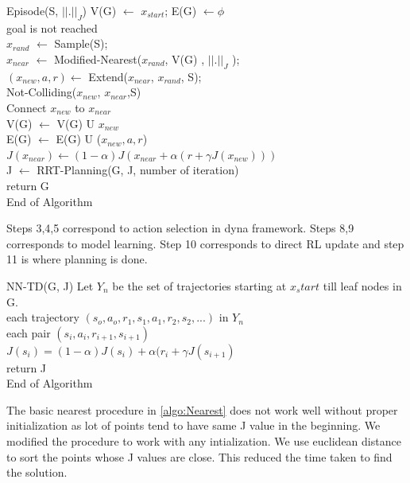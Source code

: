\documentclass[MTech]{iitmdiss}
\begin{document}
\begin{algorithm}{Episode(S, $|| . ||_J$)}{
\label{algo:Dyna-Episode}
}
 V(G) $\leftarrow$ {$x_{start}$};  E(G) $\leftarrow${$\phi$ } \\
\qwhile goal is not reached \\
$x_{rand}$ $\leftarrow$ Sample(S);\\
$x_{near}$ $\leftarrow$ Modified-Nearest($x_{rand}$, V(G) , $|| . ||_J $ );\\
$(x_{new}, a, r) \leftarrow$ Extend($x_{near}$, $x_{rand}$, S);\\
\qif Not-Colliding($x_{new}$, $x_{near}$,S)\\
\qthen Connect $x_{new}$ to $x_{near}$\\
V(G) $\leftarrow$ V(G) U {$ x_{new}$ }\\
E(G) $\leftarrow$ E(G) U ($x_{new}, a, r$)\\
$J(x_{near}) \leftarrow (1 - \alpha) J (x_{near} + \alpha (r + \gamma J(x_{new})))$ \qfi\\
J $\leftarrow$ RRT-Planning(G, J, number of iteration)\qend\\
return G\\
End of Algorithm
\end{algorithm}
Steps 3,4,5 correspond to action selection in dyna framework. Steps 8,9 corresponds to model learning. Step 10 corresponds to direct RL update and step 11 is where planning is done. 

\begin{algorithm}{NN-TD(G, J)}{
\label{algo:NN-TD}
}
Let $Y_n$ be the set of trajectories starting at $x_start$ till leaf nodes in G.\\
\qfor each trajectory $(s_o, a_o, r_1, s_1, a_1, r_2, s_2, ...)$ in $Y_n$\\
\qfor each pair $(s_i,a_i,r_{i+1}, s_{i+1})$\\
$J(s_i) = (1 - \alpha) J(s_i) + \alpha(r_i + \gamma J(s_{i+1})$\qrof\qrof\\
return J\\
End of Algorithm
\end{algorithm}

The basic nearest procedure in \ref{algo:Nearest} does not work well without proper initialization as lot of points tend to have same J value in the beginning. We modified the procedure to work with any intialization. We use euclidean distance to sort the points whose J values are close. This reduced the time taken to find the solution.
\end{document}
